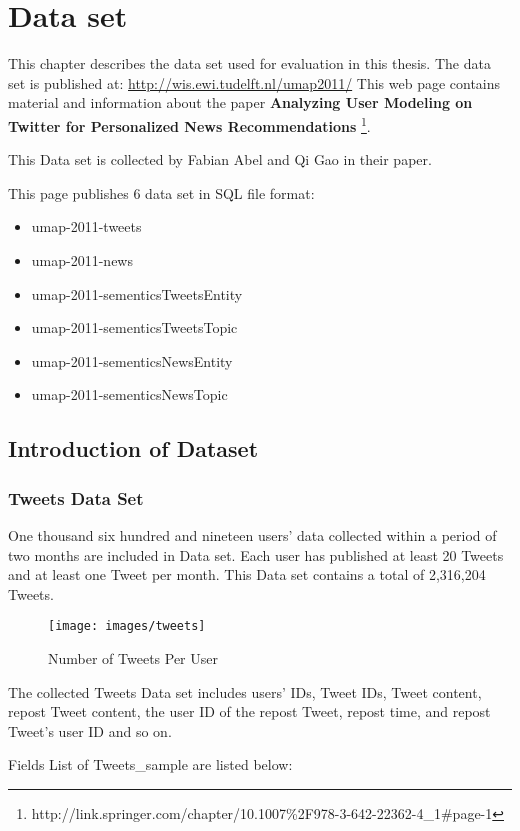 \newpage
\chapter{Data set}
This chapter describes the data set used for evaluation in this thesis. The data set is published at: \href{http://wis.ewi.tudelft.nl/umap2011/}{http://wis.ewi.tudelft.nl/umap2011/} This web page contains material and information about the paper \textbf{Analyzing User Modeling on Twitter for Personalized News Recommendations} \footnote{http://link.springer.com/chapter/10.1007\%2F978-3-642-22362-4\_1\#page-1}. 

This Data set is collected by Fabian Abel and Qi Gao in their paper\cite{Abel2011}.

This page publishes 6 data set in SQL file format:
\begin{itemize}
\item umap-2011-tweets
\item umap-2011-news
\item umap-2011-sementicsTweetsEntity
\item umap-2011-sementicsTweetsTopic
\item umap-2011-sementicsNewsEntity
\item umap-2011-sementicsNewsTopic
\end{itemize}

\section{Introduction of Dataset}
\subsection{Tweets Data Set}
One thousand six hundred and nineteen users’ data collected within a period of two months are included in Data set. Each user has published at least 20 Tweets and at least one Tweet per month. This Data set contains a total of 2,316,204 Tweets. 	

\begin{figure}[ht]
	\centering
	\texttt{[image: images/tweets]}
	\caption{Number of Tweets Per User}
	\label{NrTwPerUser}
\end{figure}

The collected Tweets Data set includes users’ IDs, Tweet IDs, Tweet content, repost Tweet content, the user ID of the repost Tweet, repost time, and repost Tweet's user ID and so on.

Fields List of Tweets\_sample are listed below:

